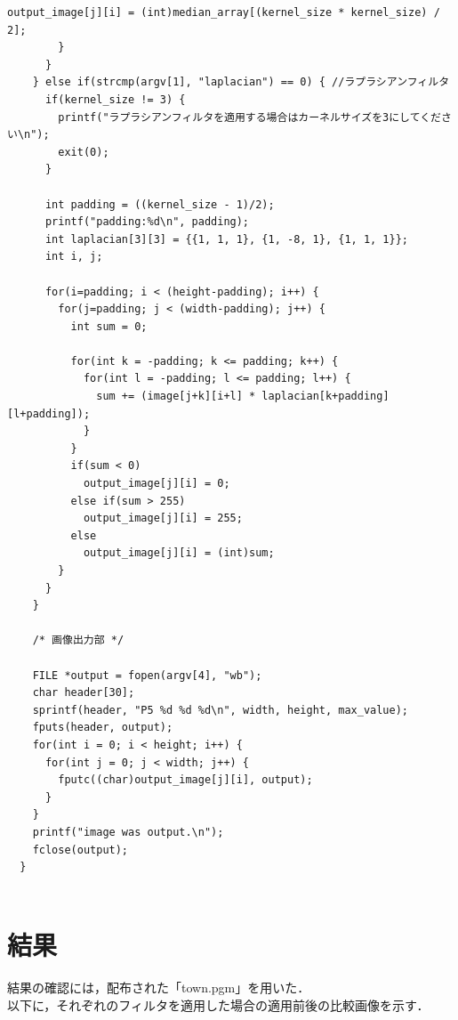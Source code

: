 \documentclass{jsarticle}
\begin{document}
\begin{lstlisting}[caption=filter.c,label=ほげ]
          output_image[j][i] = (int)median_array[(kernel_size * kernel_size) / 2];
        }
      }
    } else if(strcmp(argv[1], "laplacian") == 0) { //ラプラシアンフィルタ
      if(kernel_size != 3) {
        printf("ラプラシアンフィルタを適用する場合はカーネルサイズを3にしてください\n");
        exit(0);
      }

      int padding = ((kernel_size - 1)/2);
      printf("padding:%d\n", padding);
      int laplacian[3][3] = {{1, 1, 1}, {1, -8, 1}, {1, 1, 1}};
      int i, j;

      for(i=padding; i < (height-padding); i++) {
        for(j=padding; j < (width-padding); j++) {
          int sum = 0;

          for(int k = -padding; k <= padding; k++) {
            for(int l = -padding; l <= padding; l++) {
              sum += (image[j+k][i+l] * laplacian[k+padding][l+padding]);
            }
          }
          if(sum < 0)
            output_image[j][i] = 0;
          else if(sum > 255)
            output_image[j][i] = 255;
          else
            output_image[j][i] = (int)sum;
        }
      }
    }

    /* 画像出力部 */

    FILE *output = fopen(argv[4], "wb");
    char header[30];
    sprintf(header, "P5 %d %d %d\n", width, height, max_value);
    fputs(header, output);
    for(int i = 0; i < height; i++) {
      for(int j = 0; j < width; j++) {
        fputc((char)output_image[j][i], output);
      }
    }
    printf("image was output.\n");
    fclose(output);
  }


\end{lstlisting}

\newpage

\section{結果}
結果の確認には，配布された「town.pgm」を用いた．\\
以下に，それぞれのフィルタを適用した場合の適用前後の比較画像を示す．
\end{document}
